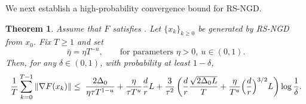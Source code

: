 \documentclass[10pt]{article}
\newtheorem{theorem}{Theorem}[section]
\begin{document}
We next establish a high-probability convergence bound for RS-NGD.

\begin{theorem}
\label{thm:RNGD_hp}
Assume that $F$ satisfies .
Let $\{x_k\}_{k\ge0}$ be generated by RS-NGD from $x_0$.
Fix $T\ge1$ and set
\[
\bar{\eta}=\eta T^{-u},
\qquad
\text{for parameters }\eta>0,\ u\in(0,1).
\]
Then, for any $\delta\in(0,1)$, with probability at least $1-\delta$,
\begin{align*}
\frac{1}{T}\sum_{k=0}^{T-1}\|\nabla F(x_k)\|
\le\;
\frac{2\Delta_0}{\eta\tau T^{1-u}}
+\frac{\eta}{\tau T^{u}}\frac{d}{r}L
+\frac{3}{\tau^2}\left(
\frac{d}{r}\frac{\sqrt{2\Delta_0L}}{T}
+\frac{\eta}{T^{u}}\Bigl(\frac{d}{r}\Bigr)^{3/2}L
\right)\log\frac{1}{\delta}.
\end{align*}
\end{theorem}
\end{document}
